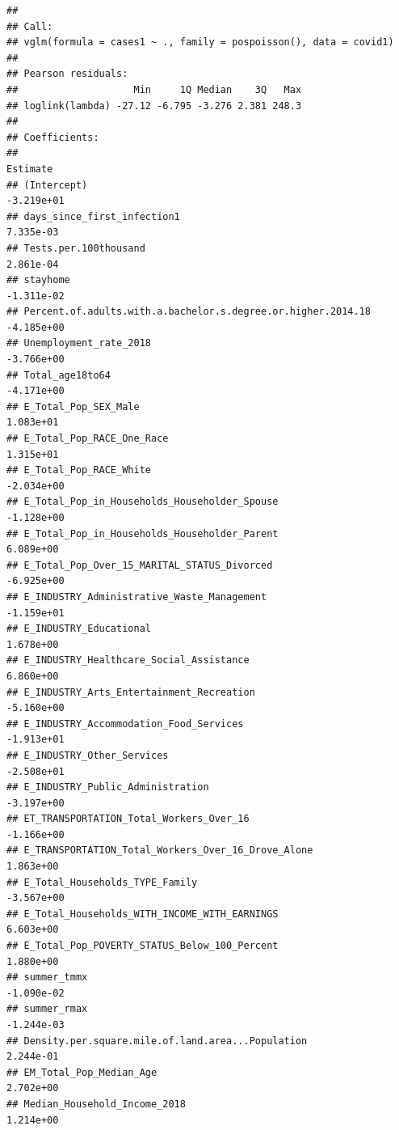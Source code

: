 \documentclass[
]{article}
\begin{document}
\begin{verbatim}
## 
## Call:
## vglm(formula = cases1 ~ ., family = pospoisson(), data = covid1)
## 
## Pearson residuals:
##                    Min     1Q Median    3Q   Max
## loglink(lambda) -27.12 -6.795 -3.276 2.381 248.3
## 
## Coefficients: 
##                                                                Estimate
## (Intercept)                                                  -3.219e+01
## days_since_first_infection1                                   7.335e-03
## Tests.per.100thousand                                         2.861e-04
## stayhome                                                     -1.311e-02
## Percent.of.adults.with.a.bachelor.s.degree.or.higher.2014.18 -4.185e+00
## Unemployment_rate_2018                                       -3.766e+00
## Total_age18to64                                              -4.171e+00
## E_Total_Pop_SEX_Male                                          1.083e+01
## E_Total_Pop_RACE_One_Race                                     1.315e+01
## E_Total_Pop_RACE_White                                       -2.034e+00
## E_Total_Pop_in_Households_Householder_Spouse                 -1.128e+00
## E_Total_Pop_in_Households_Householder_Parent                  6.089e+00
## E_Total_Pop_Over_15_MARITAL_STATUS_Divorced                  -6.925e+00
## E_INDUSTRY_Administrative_Waste_Management                   -1.159e+01
## E_INDUSTRY_Educational                                        1.678e+00
## E_INDUSTRY_Healthcare_Social_Assistance                       6.860e+00
## E_INDUSTRY_Arts_Entertainment_Recreation                     -5.160e+00
## E_INDUSTRY_Accommodation_Food_Services                       -1.913e+01
## E_INDUSTRY_Other_Services                                    -2.508e+01
## E_INDUSTRY_Public_Administration                             -3.197e+00
## ET_TRANSPORTATION_Total_Workers_Over_16                      -1.166e+00
## E_TRANSPORTATION_Total_Workers_Over_16_Drove_Alone            1.863e+00
## E_Total_Households_TYPE_Family                               -3.567e+00
## E_Total_Households_WITH_INCOME_WITH_EARNINGS                  6.603e+00
## E_Total_Pop_POVERTY_STATUS_Below_100_Percent                  1.880e+00
## summer_tmmx                                                  -1.090e-02
## summer_rmax                                                  -1.244e-03
## Density.per.square.mile.of.land.area...Population             2.244e-01
## EM_Total_Pop_Median_Age                                       2.702e+00
## Median_Household_Income_2018                                  1.214e+00

\end{verbatim}
\end{document}
